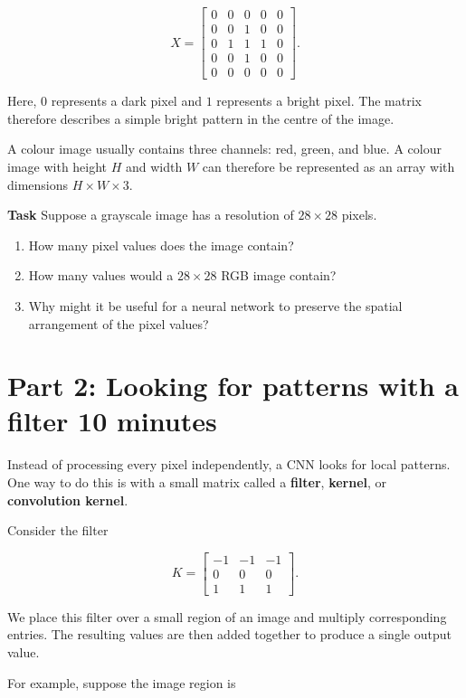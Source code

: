 \documentclass{course_sheet}
\begin{document}
\[
X =
\begin{bmatrix}
0 & 0 & 0 & 0 & 0\\
0 & 0 & 1 & 0 & 0\\
0 & 1 & 1 & 1 & 0\\
0 & 0 & 1 & 0 & 0\\
0 & 0 & 0 & 0 & 0
\end{bmatrix}.
\]

Here, $0$ represents a dark pixel and $1$ represents a bright pixel. The matrix therefore describes a simple bright pattern in the centre of the image.

A colour image usually contains three channels: red, green, and blue. A colour image with height $H$ and width $W$ can therefore be represented as an array with dimensions $H \times W \times 3$.

\textbf{Task} Suppose a grayscale image has a resolution of $28 \times 28$ pixels.

\begin{enumerate}[label=\alph*)]
    \item How many pixel values does the image contain?
    \item How many values would a $28 \times 28$ RGB image contain?
    \item Why might it be useful for a neural network to preserve the spatial arrangement of the pixel values?
\end{enumerate}

\section*{Part 2: Looking for patterns with a filter \hfill 10 minutes}

Instead of processing every pixel independently, a CNN looks for local patterns. One way to do this is with a small matrix called a \textbf{filter}, \textbf{kernel}, or \textbf{convolution kernel}.

Consider the filter

\[
K =
\begin{bmatrix}
-1 & -1 & -1\\
0 & 0 & 0\\
1 & 1 & 1
\end{bmatrix}.
\]

We place this filter over a small region of an image and multiply corresponding entries. The resulting values are then added together to produce a single output value.

For example, suppose the image region is
\end{document}
